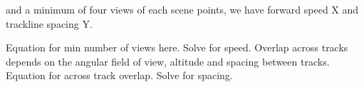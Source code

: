 and a minimum of four views of each scene points, we have forward speed X and trackline spacing Y. 

Equation for min number of views here. Solve for speed.
Overlap across tracks depends on the angular field of view, altitude and spacing between tracks. 
Equation for across track overlap. Solve for spacing.

